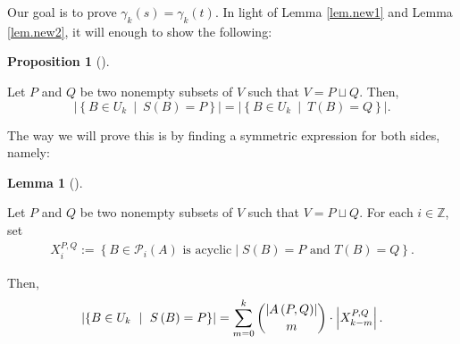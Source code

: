 \documentclass[numbers=enddot,12pt,final,onecolumn,notitlepage]{scrartcl}%
\theoremstyle{definition}
\newtheorem{lem}[theo]{Lemma}
\newenvironment{lemma}[1][]
{\begin{lem}[#1]\begin{leftbar}}
{\end{leftbar}\end{lem}}
\newtheorem{prop}[theo]{Proposition}
\newenvironment{proposition}[1][]
{\begin{prop}[#1]\begin{leftbar}}
{\end{leftbar}\end{prop}}
\let\sumnonlimits\sum
\renewcommand{\sum}{\sumnonlimits\limits}
\theoremstyle{plainsl}
\begin{document}
Our goal is to prove $\gamma_{k}\left(  s\right)  =\gamma_{k}\left(  t\right)
$. In light of Lemma \ref{lem.new1} and Lemma \ref{lem.new2}, it will enough
to show the following:

\begin{proposition}
\label{prop.new3}Let $P$ and $Q$ be two nonempty subsets of $V$ such that
$V=P\sqcup Q$. Then,%
\[
\left\vert \left\{  B\in U_{k}\ \mid\ S\left(  B\right)  =P\right\}
\right\vert =\left\vert \left\{  B\in U_{k}\ \mid\ T\left(  B\right)
=Q\right\}  \right\vert .
\]

\end{proposition}

The way we will prove this is by finding a symmetric expression for both
sides, namely:

\begin{lemma}
\label{lem.new4}Let $P$ and $Q$ be two nonempty subsets of $V$ such that
$V=P\sqcup Q$. For each $i \in\mathbb{Z}$, set
\begin{align*}
X_{i}^{P,Q} := \left\{ B \in\mathcal{P}_{i}(A) \text{ is acyclic} \mid S(B) =
P \text{ and } T(B) = Q\right\} .
\end{align*}


Then,%
\[
\left\vert \left\{  B\in U_{k}\ \mid\ S\left(  B\right)  =P\right\}
\right\vert =\sum_{m=0}^{k}\dbinom{\left\vert A\left(  P,Q\right)  \right\vert
}{m}\cdot\left\vert X_{k-m}^{P,Q}\right\vert .
\]

\end{lemma}
\end{document}
